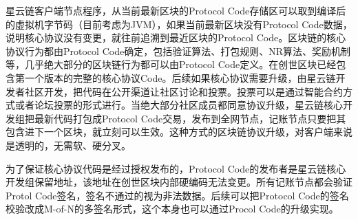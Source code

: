 星云链客户端节点程序，从当前最新区块的Protocol Code存储区可以取到编译后的虚拟机字节码（目前考虑为JVM），如果当前最新区块没有Protocol Code数据，说明核心协议没有变更，就往前追溯到最近区块的Protocol Code。区块链的核心协议行为都由Protocol Code确定，包括验证算法、打包规则、NR算法、奖励机制等，几乎绝大部分的区块链行为都可以由Protocol Code定义。在创世区块已经包含第一个版本的完整的核心协议Code。后续如果核心协议需要升级，由星云链开发者社区开发，把代码在公开渠道让社区讨论和投票。投票可以是通过智能合约方式或者论坛投票的形式进行。当绝大部分社区成员都同意协议升级，星云链核心开发组把最新代码打包成Protocol Code交易，发布到全网节点，记账节点只要把其包含进下一个区块，就立刻可以生效。这种方式的区块链协议升级，对客户端来说是透明的，无需软、硬分叉。

为了保证核心协议代码是经过授权发布的，Protocol Code的发布者是星云链核心开发组保留地址，该地址在创世区块内部硬编码无法变更。所有记账节点都会验证Protol Code签名，签名不通过的视为非法数据。后续可以把Protocol Code的签名校验改成M-of-N的多签名形式，这个本身也可以通过Procol Code的升级实现。